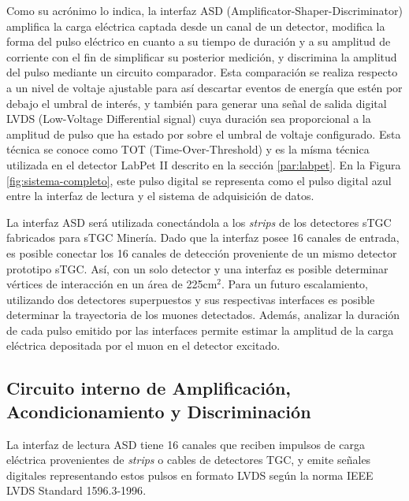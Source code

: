 Como su acrónimo lo indica, la interfaz ASD (Amplificator-Shaper-Discriminator)  amplifica la carga eléctrica captada desde un canal de un detector,  modifica la forma del pulso eléctrico en cuanto a su tiempo de duración y a su amplitud de corriente con el fin de simplificar su posterior medición, y discrimina la amplitud del pulso mediante un circuito comparador. Esta comparación se realiza respecto a un nivel de voltaje ajustable para así descartar eventos de energía que estén por debajo el umbral de interés, y también para generar una señal de salida digital LVDS (Low-Voltage Differential signal)\cite{1996IEEESociety} cuya duración sea proporcional a la amplitud de pulso que ha estado por sobre el umbral de voltaje configurado. Esta técnica se conoce como TOT (Time-Over-Threshold)  y es la mísma técnica utilizada en el detector LabPet II descrito en la sección \ref{par:labpet}.  En la Figura \ref{fig:sistema-completo}, este pulso digital se representa como el pulso digital azul entre la interfaz de lectura y el sistema de adquisición de datos.
        
La interfaz ASD será utilizada conectándola a los \textit{strips} de los detectores sTGC fabricados para sTGC Minería. Dado que la interfaz posee 16 canales de entrada, es posible conectar los 16 canales de detección proveniente de un mismo detector prototipo sTGC. Así, con un solo detector y una interfaz es posible determinar vértices de interacción en un área de 225cm$^2$. Para un futuro escalamiento, utilizando dos detectores superpuestos y sus respectivas interfaces es posible determinar la trayectoria de los muones detectados. Además, analizar la duración de cada pulso emitido por las interfaces permite estimar la amplitud de la carga eléctrica depositada por el muon en el detector excitado.


\subsection{Circuito interno de Amplificación, Acondicionamiento y Discriminación}
La interfaz de lectura ASD tiene 16 canales que reciben impulsos de carga eléctrica provenientes de \textit{strips} o cables de detectores TGC, y emite señales digitales representando estos pulsos en formato LVDS según la norma IEEE LVDS Standard 1596.3-1996\cite{1996IEEESociety}.

